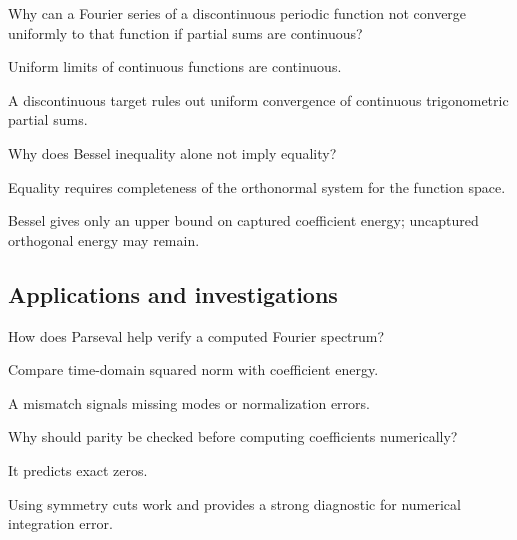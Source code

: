\begin{exercise}\label{exr:ii14-expand-11}
Why can a Fourier series of a discontinuous periodic function not converge uniformly to that function if partial sums are continuous?
\end{exercise}
\begin{hint}
Uniform limits of continuous functions are continuous.
\end{hint}
\begin{solution}
A discontinuous target rules out uniform convergence of continuous trigonometric partial sums.
\end{solution}

\begin{exercise}\label{exr:ii14-expand-12}
Why does Bessel inequality alone not imply equality?
\end{exercise}
\begin{hint}
Equality requires completeness of the orthonormal system for the function space.
\end{hint}
\begin{solution}
Bessel gives only an upper bound on captured coefficient energy; uncaptured orthogonal energy may remain.
\end{solution}

\subsection*{Applications and investigations}

\begin{exercise}\label{exr:ii14-expand-13}
How does Parseval help verify a computed Fourier spectrum?
\end{exercise}
\begin{hint}
Compare time-domain squared norm with coefficient energy.
\end{hint}
\begin{solution}
A mismatch signals missing modes or normalization errors.
\end{solution}

\begin{exercise}\label{exr:ii14-expand-14}
Why should parity be checked before computing coefficients numerically?
\end{exercise}
\begin{hint}
It predicts exact zeros.
\end{hint}
\begin{solution}
Using symmetry cuts work and provides a strong diagnostic for numerical integration error.
\end{solution}

